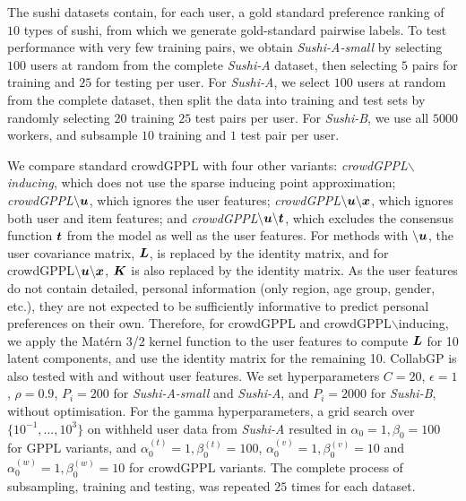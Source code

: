 The sushi datasets contain, for each user, a gold standard preference ranking 
of $10$ types of sushi,
from which we generate gold-standard pairwise labels. 
To test performance with very few training pairs, we obtain \emph{Sushi-A-small}
by selecting $100$ users at random from the complete \emph{Sushi-A} dataset,
then selecting $5$ pairs for training and $25$ for testing per user.
For \emph{Sushi-A}, we select $100$ users at random from the complete dataset, then 
split the data into training and test sets by randomly
selecting $20$ training $25$ test pairs per user. 
For \emph{Sushi-B}, we use all $5000$ workers, and subsample $10$ training and $1$ test pair per user.

We compare standard crowdGPPL with four other variants: 
\emph{crowdGPPL$\backslash$inducing}, which does 
not use the sparse inducing point approximation;
\emph{crowdGPPL$\mathbf{\backslash \boldsymbol u}$}, which ignores the user features;
 \emph{crowdGPPL$\mathbf{\backslash \boldsymbol u \backslash \boldsymbol x}$}, which ignores both user and item features;
 and
 \emph{crowdGPPL$\mathbf{\backslash \boldsymbol u \backslash \boldsymbol t}$}, which 
excludes the consensus function $\boldsymbol t$ from the model as well as the user
features. 
For methods with $\backslash\boldsymbol u$, the user covariance matrix, $\boldsymbol L$, 
is replaced by the identity matrix, 
and for crowdGPPL$\mathbf{\backslash \boldsymbol u \backslash \boldsymbol x}$, 
$\boldsymbol K$ is also replaced by the identity matrix.
As the user features do not contain detailed, personal information (only 
region, age group, gender, etc.), they are not expected
to be sufficiently informative to predict personal preferences on their own. 
Therefore, for crowdGPPL and crowdGPPL$\backslash$inducing, 
 we apply the Mat\'ern 3/2 kernel function to
 the user features to compute $\boldsymbol L$ for 10 latent components, 
 and use the identity matrix for the remaining 10.
CollabGP is also tested with and without user features.
We set hyperparameters $C=20$,
$\epsilon=1$, $\rho=0.9$, $P_i=200$ for  \emph{Sushi-A-small} and \emph{Sushi-A},
 and $P_i=2000$ for \emph{Sushi-B},
without optimisation.
For the gamma hyperparameters,  a grid search over 
$\{10^{-1},...,10^3\}$ on withheld user data from \emph{Sushi-A}
resulted in $\alpha_0=1, \beta_0=100$ for GPPL variants, and 
$\alpha_0^{(t)}=1,\beta_0^{(t)}=100$, 
$\alpha_0^{(v)}=1,\beta_0^{(v)}=10$ and
$\alpha_0^{(w)}=1,\beta_0^{(w)}=10$ for crowdGPPL variants.
The complete process of subsampling, training and testing, was repeated $25$ times
for each dataset.

